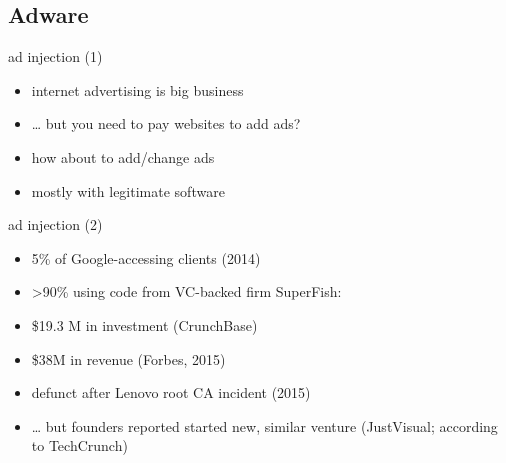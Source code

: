\subsection{Adware}

\begin{frame}{ad injection (1)}
    \begin{itemize}
        \item internet advertising is big business
        \item \ldots{} but you need to pay websites to add ads?
        \item how about  to add/change ads
        \vspace{.5cm}
        \item mostly  with legitimate software
    \end{itemize}
\end{frame}


{ %
    \begin{frame}[plain]
    \end{frame}
}

\begin{frame}{ad injection (2)}
    \begin{itemize}
        \item 5\% of Google-accessing clients (2014)
        \item >90\% using code from VC-backed firm SuperFish:
        \vspace{.5cm}
            \item \$19.3 M in investment (CrunchBase)
            \item \$38M in revenue (Forbes, 2015)
            \item defunct after Lenovo root CA incident (2015)
            \item \ldots{} but founders reported started new, similar venture (JustVisual; according to TechCrunch)
    \end{itemize}
\end{frame}

